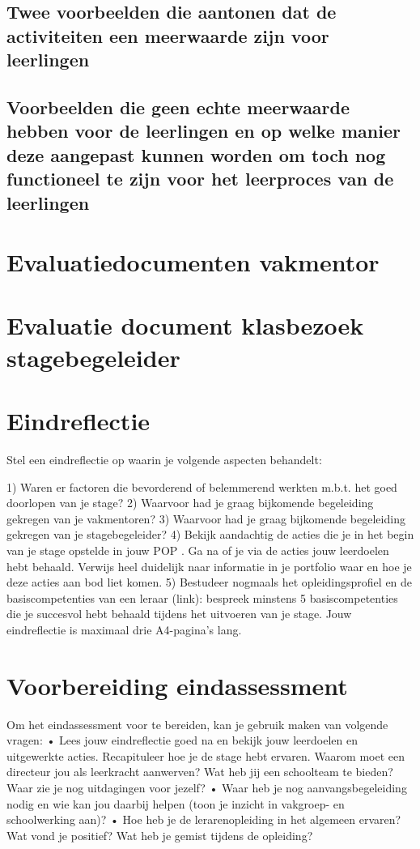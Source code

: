 \documentclass[a4paper,12pt,twoside]{article}%
\begin{document}
\subsection{Twee voorbeelden die aantonen dat de activiteiten een meerwaarde zijn voor leerlingen}


\subsection{Voorbeelden die geen echte meerwaarde hebben voor de  leerlingen en op welke manier deze aangepast kunnen worden om toch nog functioneel te zijn voor het leerproces van de leerlingen}






\section{Evaluatiedocumenten vakmentor}

\section{Evaluatie document klasbezoek stagebegeleider}

\section{Eindreflectie}
Stel een eindreflectie op waarin je volgende aspecten behandelt: 

1) Waren er factoren die bevorderend of belemmerend werkten m.b.t. het goed doorlopen van je stage? 
2) Waarvoor had je graag bijkomende begeleiding gekregen van je vakmentoren? 
3) Waarvoor had je graag bijkomende begeleiding gekregen van je stagebegeleider? 
4) Bekijk aandachtig de acties die je in het begin van je stage opstelde in jouw POP . Ga na of je via de acties jouw leerdoelen hebt behaald. Verwijs heel duidelijk naar informatie in je portfolio waar en hoe je deze acties aan bod liet komen. 
5)  Bestudeer nogmaals het opleidingsprofiel en de basiscompetenties van een leraar (link):  bespreek minstens 5 basiscompetenties die je succesvol hebt behaald tijdens het uitvoeren van je stage. 
Jouw eindreflectie is maximaal drie A4-pagina’s lang. 



\section{Voorbereiding eindassessment}

Om het eindassessment voor te bereiden, kan je gebruik maken van volgende vragen:
• Lees jouw eindreflectie goed na en bekijk jouw leerdoelen en uitgewerkte acties. Recapituleer hoe je de stage hebt ervaren. Waarom moet een directeur jou als leerkracht aanwerven? Wat heb jij een schoolteam te bieden? Waar zie je nog uitdagingen voor jezelf? 
• Waar heb je nog aanvangsbegeleiding nodig en wie kan jou daarbij helpen (toon je inzicht in vakgroep- en schoolwerking aan)?
• Hoe heb je de lerarenopleiding in het algemeen ervaren? Wat vond je positief? Wat heb je gemist tijdens de opleiding? 






 
\end{document}
